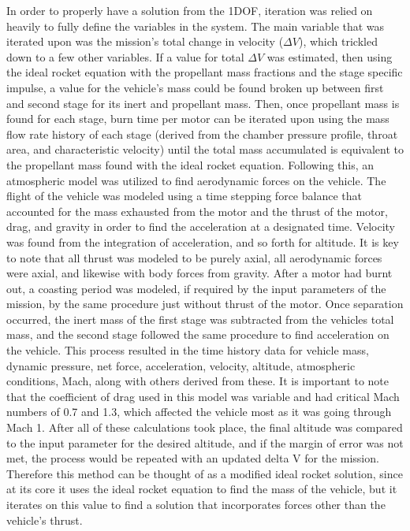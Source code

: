 In order to properly have a solution from the 1DOF, iteration was relied on heavily to fully define the variables in the system. The main variable that was iterated upon was the mission’s total change in velocity (\(\Delta V\)), which trickled down to a few other variables. If a value for total \(\Delta V\) was estimated, then using the ideal rocket equation with the propellant mass fractions and the stage specific impulse, a value for the vehicle's mass could be found broken up between first and second stage for its inert and propellant mass. Then, once propellant mass is found for each stage, burn time per motor can be iterated upon using the mass flow rate history of each stage (derived from the chamber pressure profile, throat area, and characteristic velocity) until the total mass accumulated is equivalent to the propellant mass found with the ideal rocket equation. Following this, an atmospheric model was utilized to find aerodynamic forces on the vehicle. The flight of the vehicle was modeled using a time stepping force balance that accounted for the mass exhausted from the motor and the thrust of the motor, drag, and gravity in order to find the acceleration at a designated time. Velocity was found from the integration of acceleration, and so forth for altitude. It is key to note that all thrust was modeled to be purely axial, all aerodynamic forces were axial, and likewise with body forces from gravity. After a motor had burnt out, a coasting period was modeled, if required by the input parameters of the mission, by the same procedure just without thrust of the motor. Once separation occurred, the inert mass of the first stage was subtracted from the vehicles total mass, and the second stage followed the same procedure to find acceleration on the vehicle. This process resulted in the time history data for vehicle mass, dynamic pressure, net force, acceleration, velocity, altitude, atmospheric conditions, Mach, along with others derived from these. It is important to note that the coefficient of drag used in this model was variable and had critical Mach numbers of 0.7 and 1.3, which affected the vehicle most as it was going through Mach 1. After all of these calculations took place, the final altitude was compared to the input parameter for the desired altitude, and if the margin of error was not met, the process would be repeated with an updated delta V for the mission. Therefore this method can be thought of as a modified ideal rocket solution, since at its core it uses the ideal rocket equation to find the mass of the vehicle, but it iterates on this value to find a solution that incorporates forces other than the vehicle's thrust.



